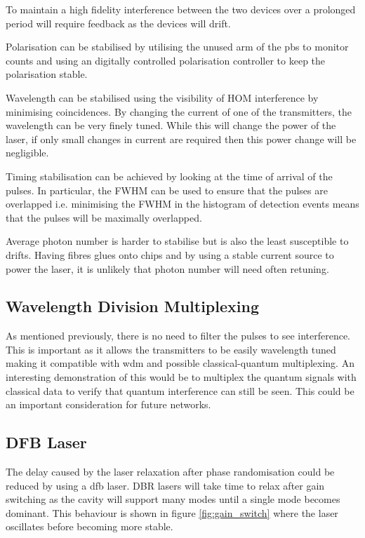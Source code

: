 To maintain a high fidelity interference between the two devices over a prolonged period will require feedback as the devices will drift. 

Polarisation can be stabilised by utilising the unused arm of the \ac{pbs} to monitor counts and using an digitally controlled polarisation controller to keep the polarisation stable.

Wavelength can be stabilised using the visibility of \ac{HOM} interference by minimising coincidences. By changing the current of one of the transmitters, the wavelength can be very finely tuned. While this will change the power of the laser, if only small changes in current are required then this power change will be negligible.

Timing stabilisation can be achieved by looking at the time of arrival of the pulses. In particular, the \ac{FWHM} can be used to ensure that the pulses are overlapped i.e. minimising the \ac{FWHM} in the histogram of detection events means that the pulses will be maximally overlapped.

Average photon number is harder to stabilise but is also the least susceptible to drifts. Having fibres glues onto chips and by using a stable current source to power the laser, it is unlikely that photon number will need often retuning.

\subsection{Wavelength Division Multiplexing}

As mentioned previously, there is no need to filter the pulses to see interference. This is important as it allows the transmitters to be easily wavelength tuned making it compatible with \ac{wdm} and possible classical-quantum multiplexing. An interesting demonstration of this would be to multiplex the quantum signals with classical data to verify that quantum interference can still be seen. This could be an important consideration for future networks.

\subsection{DFB Laser}

The delay caused by the laser relaxation after phase randomisation could be reduced by using a \ac{dfb} laser. \ac{DBR} lasers will take time to relax after gain switching as the cavity will support many modes until a single mode becomes dominant. This behaviour is shown in figure \ref{fig:gain_switch} where the laser oscillates before becoming more stable. 

